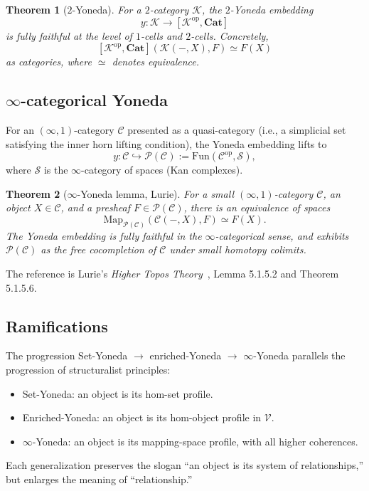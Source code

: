 \documentclass[12pt]{article}
\newtheorem{theorem}{Theorem}[section]
\theoremstyle{definition}
\theoremstyle{remark}
\begin{document}
\begin{theorem}[$2$-Yoneda]
\label{thm:2-yoneda}
For a $2$-category $\mathcal{K}$, the $2$-Yoneda embedding
\[
y\colon \mathcal{K} \to [\mathcal{K}^{\mathrm{op}}, \mathbf{Cat}]
\]
is fully faithful at the level of $1$-cells and $2$-cells. Concretely,
\[
[\mathcal{K}^{\mathrm{op}}, \mathbf{Cat}](\mathcal{K}(-, X), F) \simeq F(X)
\]
as categories, where $\simeq$ denotes equivalence.
\end{theorem}

\subsection{\texorpdfstring{$\infty$-categorical}{infinity-categorical} Yoneda}

For an $(\infty, 1)$-category $\mathcal{C}$ presented as a quasi-category (i.e., a simplicial set satisfying the inner horn lifting condition), the Yoneda embedding lifts to
\[
y\colon \mathcal{C} \hookrightarrow \mathcal{P}(\mathcal{C}) := \mathrm{Fun}(\mathcal{C}^{\mathrm{op}}, \mathcal{S}),
\]
where $\mathcal{S}$ is the $\infty$-category of spaces (Kan complexes).

\begin{theorem}[$\infty$-Yoneda lemma, Lurie]
\label{thm:infty-yoneda}
For a small $(\infty, 1)$-category $\mathcal{C}$, an object $X \in \mathcal{C}$, and a presheaf $F \in \mathcal{P}(\mathcal{C})$, there is an equivalence of spaces
\[
\mathrm{Map}_{\mathcal{P}(\mathcal{C})}(\mathcal{C}(-, X), F) \simeq F(X).
\]
The Yoneda embedding is fully faithful in the $\infty$-categorical sense, and exhibits $\mathcal{P}(\mathcal{C})$ as the free cocompletion of $\mathcal{C}$ under small homotopy colimits.
\end{theorem}

The reference is Lurie's \emph{Higher Topos Theory}~\cite{lurie}, Lemma 5.1.5.2 and Theorem 5.1.5.6.

\subsection{Ramifications}

The progression Set-Yoneda $\to$ enriched-Yoneda $\to$ $\infty$-Yoneda parallels the progression of structuralist principles:
\begin{itemize}
\item Set-Yoneda: an object is its hom-set profile.
\item Enriched-Yoneda: an object is its hom-object profile in $\mathcal{V}$.
\item $\infty$-Yoneda: an object is its mapping-space profile, with all higher coherences.
\end{itemize}
Each generalization preserves the slogan ``an object is its system of relationships,'' but enlarges the meaning of ``relationship.''
\end{document}
